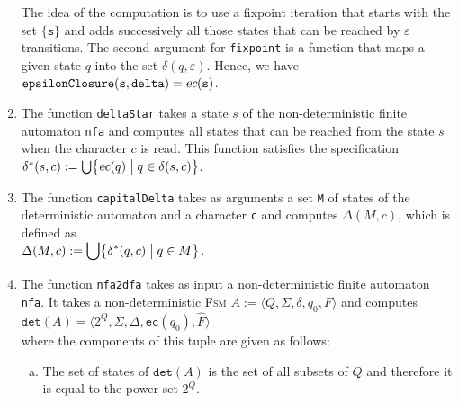 \begin{enumerate}
      The idea of the computation is to use a fixpoint iteration that starts with the set
      $\{ \mathtt{s} \}$ and adds successively all those states that can be reached by $\varepsilon$
      transitions.  The second argument for \texttt{fixpoint} is a function that maps
      a given state $q$ into the set $\delta(q, \varepsilon)$.  Hence, we have
      \\[0.2cm]
      \hspace*{1.3cm}
      $\mathtt{epsilonClosure}(\mathtt{s}, \mathtt{delta}) = \textsl{ec}(\mathtt{s})$.
\item The function \texttt{deltaStar} takes a state $s$ of the non-deterministic finite
      automaton \texttt{nfa} and computes all states that can be reached from the state
      $s$ when the character $c$ is read.  This function satisfies the specification
      \\[0.2cm]
      \hspace*{1.3cm}
      $\delta^*(s,c) := 
       \bigcup \bigl\{ \textsl{ec}(q) \bigm| q \in \delta(s, c) \bigr \}$.
\item The function \texttt{capitalDelta} takes as arguments a set \texttt{M} of states
      of the deterministic automaton and a character \texttt{c} and computes
      $\Delta(M,c)$, which is defined as
      \\[0.2cm]
      \hspace*{1.3cm}
      $\displaystyle\Delta(M,c) := \bigcup \bigl\{ \delta^*(q,c) \bigm| q \in M \bigr\}$.
\item The function \texttt{nfa2dfa} takes as input a non-deterministic finite automaton
      \texttt{nfa}.  It takes a non-deterministic \textsc{Fsm} 
      $A := \bigl\langle Q, \Sigma, \delta, q_0, F \bigr\rangle$ and computes 
      \\[0.2cm]
      \hspace*{1.3cm}
      $\texttt{det}(A) = \bigl\langle 2^Q, \Sigma, \Delta, \texttt{ec}(q_0), \widehat{F} \bigr\rangle$
      \\[0.2cm]
      where the components of this tuple are given as follows:
      \begin{enumerate}[(a)]
      \item The set of states of $\texttt{det}(A)$ is the set of all subsets of $Q$ and therefore it is equal
            to the power set $2^Q$. 


\end{enumerate}
\end{enumerate}
